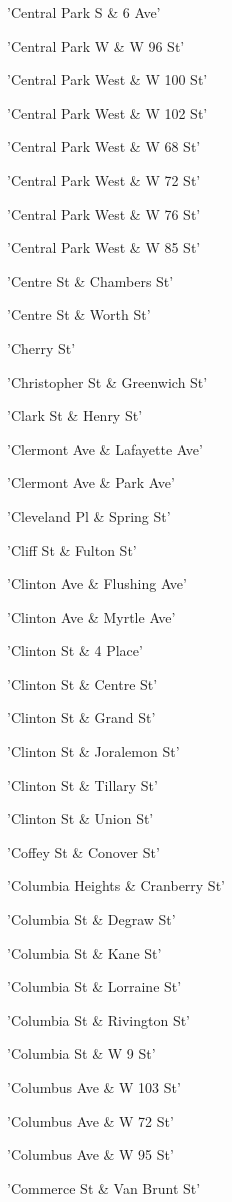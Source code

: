 \documentclass[11pt]{article}
\begin{document}
\begin{enumerate*}
\item 'Central Park S \& 6 Ave'
\item 'Central Park W \& W 96 St'
\item 'Central Park West \& W 100 St'
\item 'Central Park West \& W 102 St'
\item 'Central Park West \& W 68 St'
\item 'Central Park West \& W 72 St'
\item 'Central Park West \& W 76 St'
\item 'Central Park West \& W 85 St'
\item 'Centre St \& Chambers St'
\item 'Centre St \& Worth St'
\item 'Cherry St'
\item 'Christopher St \& Greenwich St'
\item 'Clark St \& Henry St'
\item 'Clermont Ave \& Lafayette Ave'
\item 'Clermont Ave \& Park Ave'
\item 'Cleveland Pl \& Spring St'
\item 'Cliff St \& Fulton St'
\item 'Clinton Ave \& Flushing Ave'
\item 'Clinton Ave \& Myrtle Ave'
\item 'Clinton St \& 4 Place'
\item 'Clinton St \& Centre St'
\item 'Clinton St \& Grand St'
\item 'Clinton St \& Joralemon St'
\item 'Clinton St \& Tillary St'
\item 'Clinton St \& Union St'
\item 'Coffey St \& Conover St'
\item 'Columbia Heights \& Cranberry St'
\item 'Columbia St \& Degraw St'
\item 'Columbia St \& Kane St'
\item 'Columbia St \& Lorraine St'
\item 'Columbia St \& Rivington St'
\item 'Columbia St \& W 9 St'
\item 'Columbus Ave \& W 103 St'
\item 'Columbus Ave \& W 72 St'
\item 'Columbus Ave \& W 95 St'
\item 'Commerce St \& Van Brunt St'

\end{enumerate*}
\end{document}
